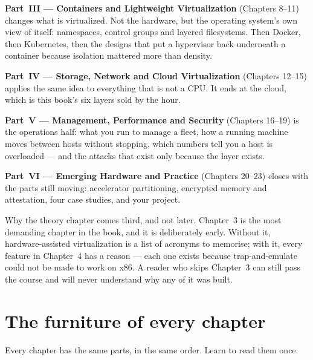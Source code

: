 \textbf{Part~III --- Containers and Lightweight Virtualization} (Chapters 8--11)
changes what is virtualized. Not the hardware, but the operating system's own
view of itself: namespaces, control groups and layered filesystems. Then Docker,
then Kubernetes, then the designs that put a hypervisor back underneath a
container because isolation mattered more than density.

\textbf{Part~IV --- Storage, Network and Cloud Virtualization} (Chapters 12--15)
applies the same idea to everything that is not a CPU. It ends at the cloud,
which is this book's six layers sold by the hour.

\textbf{Part~V --- Management, Performance and Security} (Chapters 16--19) is
the operations half: what you run to manage a fleet, how a running machine moves
between hosts without stopping, which numbers tell you a host is overloaded ---
and the attacks that exist only because the layer exists.

\textbf{Part~VI --- Emerging Hardware and Practice} (Chapters 20--23) closes
with the parts still moving: accelerator partitioning, encrypted memory and
attestation, four case studies, and your project.

\begin{conceptbox}
Why the theory chapter comes third, and not later. Chapter~3 is the most
demanding chapter in the book, and it is deliberately early. Without it,
hardware-assisted virtualization is a list of acronyms to memorise; with it,
every feature in Chapter~4 has a reason --- each one exists because
trap-and-emulate could not be made to work on x86. A reader who skips
Chapter~3 can still pass the course and will never understand why any of it
was built.
\end{conceptbox}

\section*{The furniture of every chapter}

Every chapter has the same parts, in the same order. Learn to read them once.

